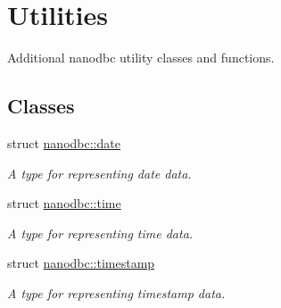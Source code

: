 \hypertarget{group__utility}{}\section{Utilities}
\label{group__utility}


Additional nanodbc utility classes and functions.  


\subsection*{Classes}
\begin{DoxyCompactItemize}
\item 
struct \mbox{\hyperlink{structnanodbc_1_1date}{nanodbc\+::date}}
\begin{DoxyCompactList}\small\item\em A type for representing date data. \end{DoxyCompactList}\item 
struct \mbox{\hyperlink{structnanodbc_1_1time}{nanodbc\+::time}}
\begin{DoxyCompactList}\small\item\em A type for representing time data. \end{DoxyCompactList}\item 
struct \mbox{\hyperlink{structnanodbc_1_1timestamp}{nanodbc\+::timestamp}}
\begin{DoxyCompactList}\small\item\em A type for representing timestamp data. \end{DoxyCompactList}\end{DoxyCompactItemize}
